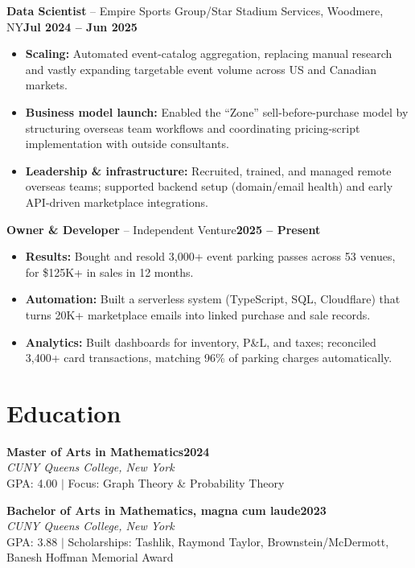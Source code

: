 \documentclass[10pt,letterpaper]{article}
\newcommand{\role}[3]{\textbf{#1} -- #2\hfill\textbf{#3}\par\vspace{1pt}}
\newcommand{\lead}[1]{\textbf{#1:}}
\begin{document}
\vspace{3pt}
\role{Data Scientist}{Empire Sports Group/Star Stadium Services, Woodmere, NY}{Jul 2024 -- Jun 2025}
\begin{itemize}
  \item \lead{Scaling} Automated event-catalog aggregation, replacing manual research and vastly expanding
        targetable event volume across US and Canadian markets.
  \item \lead{Business model launch} Enabled the ``Zone'' sell-before-purchase model by structuring overseas team
        workflows and coordinating pricing-script implementation with outside consultants.
  \item \lead{Leadership \& infrastructure} Recruited, trained, and managed remote overseas teams; supported backend
        setup (domain/email health) and early API-driven marketplace integrations.
\end{itemize}

\vspace{3pt}
\role{Owner \& Developer}{Independent Venture}{2025 -- Present}
\begin{itemize}
  \item \lead{Results} Bought and resold 3,000+ event parking passes across 53 venues, for \$125K+ in sales in 12
        months.
  \item \lead{Automation} Built a serverless system (TypeScript, SQL, Cloudflare) that turns 20K+ marketplace emails
        into linked purchase and sale records.
  \item \lead{Analytics} Built dashboards for inventory, P\&L, and taxes; reconciled 3,400+ card transactions,
        matching 96\% of parking charges automatically.
\end{itemize}

\section{Education}

\textbf{Master of Arts in Mathematics}\hfill\textbf{2024}\\
\emph{CUNY Queens College, New York}\\
GPA: 4.00 $|$ Focus: Graph Theory \& Probability Theory

\vspace{4pt}
\textbf{Bachelor of Arts in Mathematics, magna cum laude}\hfill\textbf{2023}\\
\emph{CUNY Queens College, New York}\\
GPA: 3.88 $|$ Scholarships: Tashlik, Raymond Taylor, Brownstein/McDermott, Banesh Hoffman Memorial Award
\end{document}
